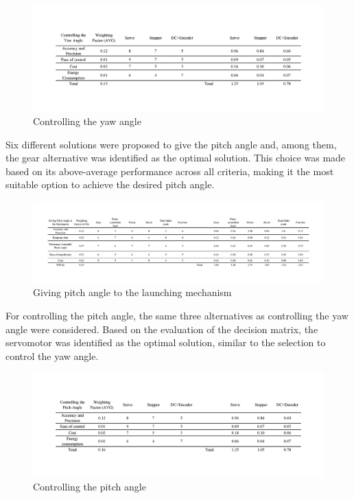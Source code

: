 \documentclass[12pt]{article}
\begin{document}
\begin{figure}[H]
    \centering
    \includegraphics[width=1\textwidth]{Decision matrices/controlling yaw.png}
    \caption{Controlling the yaw angle}
\end{figure}

Six different solutions were proposed to give the pitch angle and, among them, the gear alternative was identified as the optimal solution. This choice was made based on its above-average performance across all criteria, making it the most suitable option to achieve the desired pitch angle.

\begin{figure}[H]
    \centering
    \includegraphics[width=1\textwidth]{Decision matrices/pitch.png}
    \caption{Giving pitch angle to the launching mechanism}
\end{figure}

For controlling the pitch angle, the same three alternatives as controlling the yaw angle were considered. Based on the evaluation of the decision matrix, the servomotor was identified as the optimal solution, similar to the selection to control the yaw angle.

\begin{figure}[H]
    \centering
    \includegraphics[width=1\textwidth]{Decision matrices/controlling pitch.png}
    \caption{Controlling the pitch angle}
\end{figure}
\end{document}
